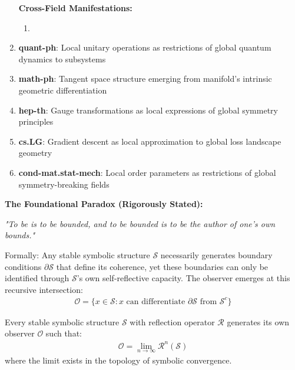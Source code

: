 \begin{scholium}
\begin{enumerate}
\textbf{Cross-Field Manifestations:}
\begin{enumerate}
    \item 
\end{enumerate}
\item \textbf{quant-ph}: Local unitary operations as restrictions of global quantum dynamics to subsystems
\item \textbf{math-ph}: Tangent space structure emerging from manifold's intrinsic geometric differentiation
\item \textbf{hep-th}: Gauge transformations as local expressions of global symmetry principles
\item \textbf{cs.LG}: Gradient descent as local approximation to global loss landscape geometry
\item \textbf{cond-mat.stat-mech}: Local order parameters as restrictions of global symmetry-breaking fields
\end{enumerate}

\textbf{The Foundational Paradox (Rigorously Stated):}
\begin{center}
\textit{"To be is to be bounded, and to be bounded is to be the author of one's own bounds."}
\end{center}

Formally: Any stable symbolic structure $\mathcal{S}$ necessarily generates boundary conditions $\partial \mathcal{S}$ that define its coherence, yet these boundaries can only be identified through $\mathcal{S}$'s own self-reflective capacity. The observer emerges at this recursive intersection:
\begin{align}
\mathcal{O} = \{x \in \mathcal{S} : x \text{ can differentiate } \partial \mathcal{S} \text{ from } \mathcal{S}^c\}
\end{align}

\begin{theorem}
\label{theorem:constitutive_bootstrap}
Every stable symbolic structure $\mathcal{S}$ with reflection operator $\mathcal{R}$ generates its own observer $\mathcal{O}$ such that:
\begin{align}
\mathcal{O} = \lim_{n \to \infty} \mathcal{R}^n(\mathcal{S})
\end{align}
where the limit exists in the topology of symbolic convergence.


\end{theorem}
\end{scholium}
